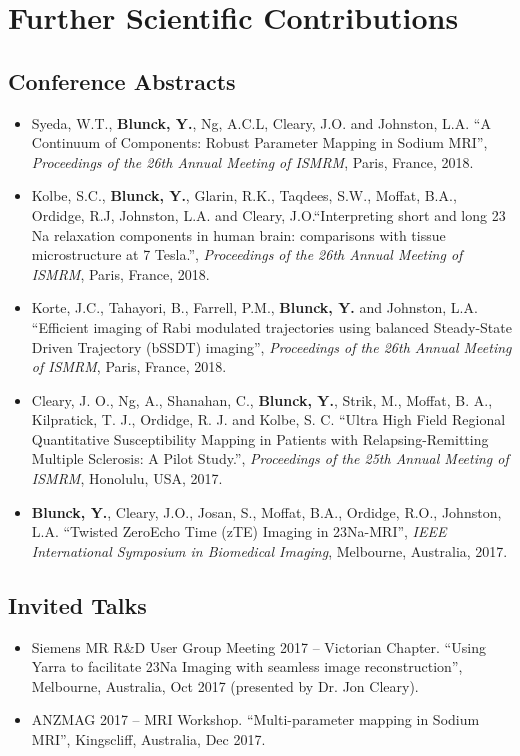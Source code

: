 \documentclass[11pt,a4paper]{book}
\begin{document}
	\section*{\color{GRAY2} \hspace{3cm} \LARGE Further Scientific Contributions}
	
	\subsection*{Conference Abstracts}
	\begin{itemize}
		
		\item Syeda, W.T., \textbf{Blunck, Y.}, Ng, A.C.L, Cleary, J.O. and Johnston, L.A. ``A Continuum of Components: Robust Parameter Mapping in Sodium MRI'', \emph{Proceedings of the 26th Annual Meeting of ISMRM}, Paris, France, 2018.

		\item Kolbe, S.C., \textbf{Blunck, Y.}, Glarin, R.K., Taqdees, S.W., Moffat, B.A., Ordidge, R.J, Johnston, L.A. and Cleary, J.O.``Interpreting short and long 23 Na relaxation components in human brain: comparisons with tissue microstructure at 7 Tesla.'', \emph{Proceedings of the 26th Annual Meeting of ISMRM}, Paris, France, 2018.
		
		\item Korte, J.C., Tahayori, B., Farrell, P.M., \textbf{Blunck, Y.} and Johnston, L.A. ``Efficient imaging of Rabi modulated trajectories using balanced Steady-State Driven Trajectory (bSSDT) imaging'', \emph{Proceedings of the 26th Annual Meeting of ISMRM}, Paris, France, 2018.
		
		\item Cleary, J. O., Ng, A., Shanahan, C., \textbf{Blunck, Y.}, Strik, M., Moffat, B. A., Kilpratick, T. J., Ordidge, R. J. and	Kolbe, S. C. ``Ultra High Field Regional Quantitative Susceptibility Mapping in Patients with Relapsing-Remitting Multiple Sclerosis: A Pilot Study.'', \emph{Proceedings of the 25th Annual Meeting of ISMRM}, Honolulu, USA, 2017.
		
		\item \textbf{Blunck, Y.}, Cleary, J.O., Josan, S., Moffat, B.A., Ordidge, R.O., Johnston, L.A. ``Twisted ZeroEcho Time (zTE) Imaging in 23Na-MRI'', \emph{IEEE International Symposium in Biomedical Imaging}, Melbourne, Australia, 2017.
		
	\end{itemize}
	\subsection*{Invited Talks} 
	\begin{itemize}
		\item Siemens MR R\&D User Group Meeting 2017 -- Victorian Chapter. ``Using Yarra to facilitate 23Na Imaging with
		seamless image reconstruction'', Melbourne, Australia, Oct 2017 (presented by Dr. Jon Cleary).
		
		\item ANZMAG 2017 -- MRI Workshop. ``Multi-parameter mapping in Sodium MRI'', Kingscliff, Australia, Dec 2017.
	\end{itemize}
\end{document}
